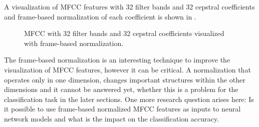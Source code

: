 A visualization of MFCC features with 32 filter bands and 32 cepstral coefficients and frame-based normalization of each coefficient is shown in .
\begin{figure}[!ht]
  \centering
  \caption{MFCC with 32 filter bands and 32 cepstral coefficients visualized with frame-based normalization.}
  \label{fig:signal_mfcc_showcase_mfcc32}
\end{figure}
\FloatBarrier
\noindent
The frame-based normalization is an interesting technique to improve the visualization of MFCC features, however it can be critical. 
A normalization that operates only in one dimension, changes important structures within the other dimensions and it cannot be answered yet, whether this is a problem for the classification task in the later sections.
One more research question arises here: Is it possible to use frame-based normalized MFCC features as inputs to neural network models and what is the impact on the classification accuracy.


